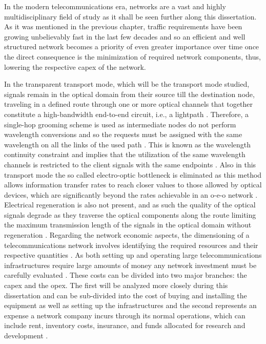 In the modern telecommunications era, networks are a vast and highly multidisciplinary field of study as it shall be seen further along this dissertation. As it was mentioned in the previous chapter, traffic requirements have been growing unbelievably fast in the last few decades and so an efficient and well structured network becomes a priority of even greater importance over time once the direct consequence is the minimization of required network components, thus, lowering the respective \gls{capex} of the network. \par In the transparent transport mode, which will be the transport mode studied, signals remain in the optical domain from their source till the destination node, traveling in a defined route through one or more optical channels that together constitute a high-bandwidth end-to-end circuit, i.e., a lightpath \cite{1255431}. Therefore, a single-hop grooming scheme is used as intermediate nodes do not perform wavelength conversions and so the requests must be assigned with the same wavelength on all the links of the used path \cite{Sridharan:2004:BAN:987232.987247}. This is known as the wavelength continuity constraint and implies that the utilization of the same wavelength channels is restricted to the client signals with the same endpoints \cite{RuiMoraisPhD}. Also in this transport mode the so called electro-optic bottleneck is eliminated as this method allows information transfer rates to reach closer values to those allowed by optical devices, which are significantly beyond the rates achievable in an \gls{o-e-o} network \cite{664268}. Electrical regeneration is also not present, and as such the quality of the optical signals degrade as they traverse the optical components along the route limiting the maximum transmission length of the signals in the optical domain without regeneration \cite{RuiMoraisPhD}. Regarding the network economic aspects, the dimensioning of a telecommunications network involves identifying the required resources and their respective quantities \cite{estimatingCapex}. As both setting up and operating large telecommunications infrastructures require large amounts of money any network investment must be carefully evaluated \cite{anpinto2}. These costs can be divided into two major branches: the \gls{capex} and the \gls{opex}. The first will be analyzed more closely during this dissertation and can be sub-divided into the cost of buying and installing the equipment as well as setting up the infrastructures and the second represents an expense a network company incurs through its normal operations, which can include rent, inventory costs, insurance, and funds allocated for research and development \cite{anpinto}\cite{OPEX}.

